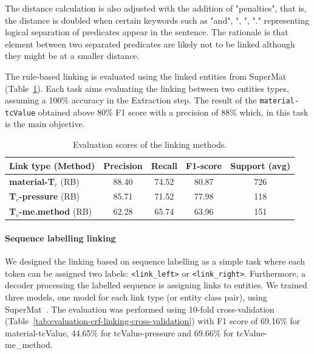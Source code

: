 \documentclass{article}
\newcommand{\tc}{T$_{c}$}
\begin{document}
The distance calculation is also adjusted with the addition of "penalties", that is, the distance is doubled when certain keywords such as "and", ", ", "." representing logical separation of predicates appear in the sentence. The rationale is that element between two separated predicates are likely not to be linked although they might be at a smaller distance. 

The rule-based linking is evaluated using the linked entities from SuperMat~\cite{foppiano2021supermat} (Table~\ref{table:evaluation-linking}). 
Each task aims evaluating the linking between two entities types, assuming a 100\% accuracy in the Extraction step. 
The result of the \texttt{material-tcValue} obtained above 80\% F1 score with a precision of 88\% which, in this task is the main objective.

\begin{table}[ht]
\centering
\begin{tabular}{lcccc}
\hline \textbf{Link type} (Method) & \textbf{Precision} & \textbf{Recall} & \textbf{F1-score} & Support (avg) \\ \hline
\textbf{material-\tc} (RB)      &  88.40    & 74.52 &    80.87 &   726  \\
\textbf{\tc-pressure} (RB)      & 85.71  &  71.52  &  77.98  &  118     \\
\textbf{\tc-me.method} (RB)     & 62.28 & 65.74 &  63.96  &  151 \\
\hline
\end{tabular}
\caption{\label{table:evaluation-linking} Evaluation scores of the linking methods. }
\end{table}

\paragraph{Sequence labelling linking} We designed the linking based on sequence labelling as a simple task where each token can be assigned two labels: \texttt{<link\_left>} or \texttt{<link\_right>}. 
Furthermore, a decoder processing the labelled sequence is assigning links to entities.
We trained three models, one model for each link type (or entity class pair), using SuperMat~\cite{foppiano2021supermat}.
The evaluation was performed using 10-fold cross-validation (Table~\ref{tab:evaluation-crf-linking-cross-validation}) with F1 score of 69.16\% for material-tcValue, 44.65\% for tcValue-pressure and 69.66\% for tcValue-me\_method. 
\end{document}
